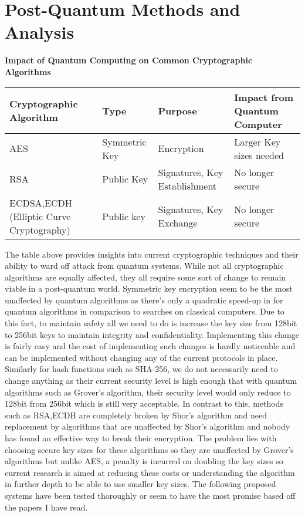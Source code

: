 \documentclass[10pt,a4paper]{article}
\begin{document}
\section{Post-Quantum Methods and Analysis}
\begin{center}
	\textbf{Impact of Quantum Computing on Common Cryptographic Algorithms}
	\begin{tabular}{ | m{5cm} | m{2cm} | m{5cm} | m{4cm} | }
		\hline
		Cryptographic Algorithm & Type & Purpose & Impact from Quantum Computer \\
		\hline
		AES & Symmetric Key & Encryption & Larger Key sizes needed \\
		\hline
		RSA & Public Key & Signatures, Key Establishment & No longer secure \\
		\hline
		ECDSA,ECDH (Elliptic Curve Cryptography)  &Public key &Signatures, Key Exchange &No longer secure \\
		\hline
	\end{tabular}
\end{center}
The table above provides insights into current cryptographic techniques and their ability to ward off attack from quantum systems. While not all cryptographic algorithms are equally affected, they all require some sort of change to remain viable in a post-quantum world. Symmetric key encryption seem to be the most unaffected by quantum algorithms as there's only a quadratic speed-up in for quantum algorithms in comparison to searches on classical computers. Due to this fact, to maintain safety all we need to do is increase the key size from 128bit to 256bit keys to maintain integrity and confidentiality. Implementing this change is fairly easy and the cost of implementing such changes is hardly noticeable and can be implemented without changing any of the current protocols in place. Similarly for hash functions such as SHA-256, we do not necessarily need to change anything as their current security level is high enough that with quantum algorithms such as Grover's algorithm, their security level would only reduce to 128bit from 256bit which is still very acceptable.
\newline
\newline
In contrast to this, methods such as RSA,ECDH are completely broken by Shor's algorithm and need replacement by algorithms that are unaffected by Shor's algorithm and nobody has found an effective way to break their encryption. The problem lies with choosing secure key sizes for these algorithms so they are unaffected by Grover's algorithms but unlike AES, a penalty is incurred on doubling the key sizes so current research is aimed at reducing these costs or understanding the algorithm in further depth to be able to use smaller key sizes. The following proposed systems have been tested thoroughly or seem to have the most promise based off the papers I have read.
\end{document}
